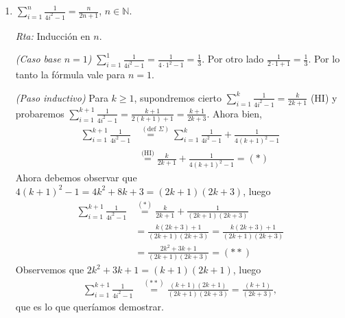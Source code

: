 \documentclass[12pt,spanish,makeidx]{amsbook}
\newcommand{\rta}{\noindent\textit{Rta: }}
\begin{document}
\begin{enumerate}
\begin{enumerate}
			\rta Inducción en $n$.
			
			\textit{(Caso base $n=1$) } $\prod_{i=1}^1 \frac{i+1}{i} = \frac{2}{1} = 2$. Verdadero.   
			
			\textit{(Paso inductivo) }  Para  $k \ge 1$,  supondremos cierto $\prod_{i=1}^k \frac{i+1}{i} = k+1$ y probaremos que $\prod_{i=1}^{k+1} \frac{i+1}{i} = k+2$. Ahora bien,
			\begin{align*}
				\prod_{i=1}^{k+1} \frac{i+1}{i} &\overset{(\text{def } \Pi)}{=\quad} \prod_{i=1}^k \frac{i+1}{i} \cdot \frac{k+2}{k+1} \overset{\text{(HI)}}{=} (k+1) \cdot \frac{k+2}{k+1} = k+2.
			\end{align*}
			
			
			\item $\displaystyle{ \sum_{i=1}^n \frac{1}{4i^2-1} = \frac{n}{2n+1}}$, $n\in \mathbb N$.
			
			\rta Inducción en $n$.
			
			\textit{(Caso base $n=1$) } $\sum_{i=1}^1 \frac{1}{4i^2-1} = \frac{1}{4\cdot 1^2-1} = \frac13$. Por otro lado $\frac{1}{2\cdot 1+1} = \frac13$. Por lo tanto la fórmula vale para $n=1$.  
			
			\textit{(Paso inductivo) }  Para  $k \ge 1$,  supondremos cierto $\sum_{i=1}^k \frac{1}{4i^2-1} = \frac{k}{2k+1}$ (HI) y probaremos $\sum_{i=1}^{k+1} \frac{1}{4i^2-1} = \frac{k+1}{2(k+1)+1} = \frac{k+1}{2k+3}$. Ahora bien,
			\begin{align*}
			\sum_{i=1}^{k+1} \frac{1}{4i^2-1} &\overset{(\text{def } \Sigma)}{=\quad}\sum_{i=1}^{k} \frac{1}{4i^2-1} +  \frac{1}{4(k+1)^2-1}\\
			&\overset{\text{(HI)}}{=} \frac{k}{2k+1} + \frac{1}{4(k+1)^2-1} = (*)
			\end{align*}
			Ahora debemos observar que $4(k+1)^2-1 = 4k^2 +8k+3 = (2k+1)(2k+3)$, luego
			\begin{align*}
			\sum_{i=1}^{k+1} \frac{1}{4i^2-1} &\overset{(*)}{=} \frac{k}{2k+1} + \frac{1}{(2k+1)(2k+3)} \\
			&=  \frac{k(2k+3) +1}{(2k+1)(2k+3)} = \frac{k(2k+3) +1}{(2k+1)(2k+3)} \\
			&=  \frac{2k^2+3k +1}{(2k+1)(2k+3)}  = (**)
			\end{align*}
			Observemos  que $2k^2+3k +1 = (k+1)(2k+1)$, luego
			\begin{align*}
			\sum_{i=1}^{k+1} \frac{1}{4i^2-1} &\overset{(**)}{=} \frac{(k+1)(2k+1)}{(2k+1)(2k+3)} = \frac{(k+1)}{(2k+3)},
			\end{align*}
			que es lo que queríamos demostrar.
			

\end{enumerate}
\end{enumerate}
\end{document}
